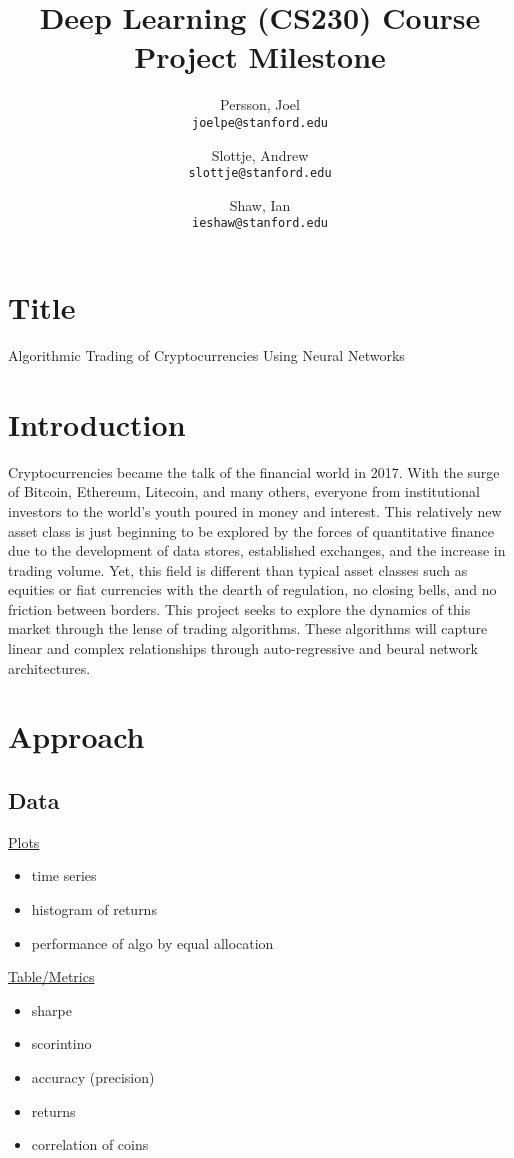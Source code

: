 \documentclass{article}
\title{Deep Learning (CS230) Course Project Milestone}
\author{
  Persson, Joel\\
  \texttt{joelpe@stanford.edu}
  \and
  Slottje, Andrew\\
  \texttt{slottje@stanford.edu}
  \and
  Shaw, Ian\\
  \texttt{ieshaw@stanford.edu}
}
\begin{document}
\maketitle

\section*{Title}
\begin{center}
 Algorithmic Trading of Cryptocurrencies Using Neural Networks
 \end{center}
\section{Introduction}

Cryptocurrencies became the talk of the financial world in 2017. With the surge of Bitcoin, Ethereum, Litecoin, and many others, everyone from institutional investors to the world's youth poured in money and interest. This relatively new asset class is just beginning to be explored by the forces of quantitative finance due to the development of data stores, established exchanges, and the increase in trading volume. Yet, this field is different than typical asset classes such as equities or fiat currencies with the dearth of regulation, no closing bells, and no friction between borders. This project seeks to explore the dynamics of this market through the lense of trading algorithms. These algorithms will capture linear and complex relationships through auto-regressive and beural network architectures. 


\section{Approach}

\subsection{Data}

\underline{Plots}
\begin{itemize}
\item time series
\item histogram of returns
\item performance of algo by equal allocation
\end{itemize}

\underline{Table/Metrics}
\begin{itemize}
\item sharpe
\item scorintino
\item accuracy (precision)
\item returns
\item correlation of coins
\end{itemize}
\end{document}
